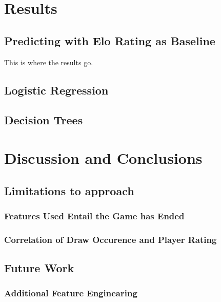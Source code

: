 \documentclass[12pt]{article}
\begin{document}
\section{Results}
\label{sec:results}

\subsection{Predicting with Elo Rating as Baseline}
This is where the results go.

\subsection{Logistic Regression}

\subsection{Decision Trees}

\section{Discussion and Conclusions}
\label{sec:discussion}

\subsection{Limitations to approach}

\subsubsection{Features Used Entail the Game has Ended}

\subsubsection{Correlation of Draw Occurence and Player Rating}

\subsection{Future Work}

\subsubsection{Additional Feature Enginearing}
\newpage

\end{document}
